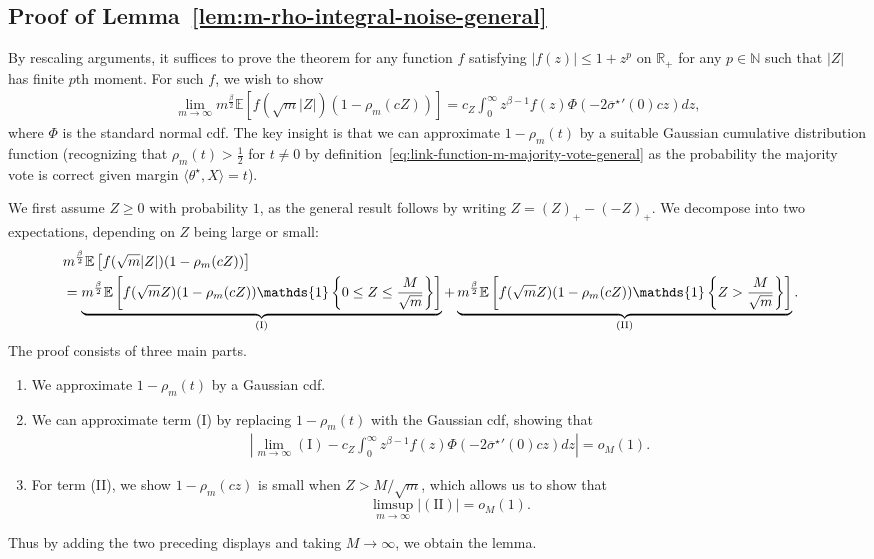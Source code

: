 \documentclass[11pt]{article}
\newcommand{\ind}{\mathds{1}}
\newcommand{\Ep}{\mathbb{E}}
\newcommand{\R}{\mathbb{R}} %
\newcommand{\N}{\mathbb{N}} %
\newcommand{\wb}[1]{\overline{#1}}
\newcommand{\<}{\langle} %
\renewcommand{\>}{\rangle}
\newcommand{\half}{\frac{1}{2}}
\newcommand{\opt}{^\star}
\begin{document}
\subsection{Proof of Lemma~\ref{lem:m-rho-integral-noise-general}} \label{proof:m-rho-integral-noise-general}
By rescaling arguments, it suffices to prove the theorem for any function
$f$ satisfying
$|f(z)| \leq 1 + z^p$ on $\R_+$ for any $p \in \N$ such that $|Z|$
has finite $p$th moment.  For such $f$, we wish to
show
\begin{align*}
  \lim_{m \to \infty} m^{\frac{\beta}{2}} \Ep \left[f(\sqrt{m}|Z|) (1 - \rho_m(c Z))\right] = c_Z \int_0^\infty z^{\beta-1} f(z) \Phi \left(-2 {\wb{\sigma}\opt}'(0) c z\right) dz,
\end{align*}
where $\Phi$ is the standard normal cdf. The key insight is that we can
approximate $1 - \rho_m(t)$ by a suitable Gaussian cumulative distribution
function (recognizing that $\rho_m(t) > \half$ for $t \neq 0$ by
definition~\eqref{eq:link-function-m-majority-vote-general} as the
probability the majority vote is correct given margin
$\<\theta\opt, X\> = t$).

We first assume $Z \geq 0$ with probability $1$, as the general result
follows by writing $Z = (Z)_+ - (-Z)_+$.  We decompose into two
expectations, depending on $Z$ being large or small:
\begin{align}
  \lefteqn{m^{\frac{\beta}{2}} \Ep \left[f(\sqrt m |Z|) (1 - \rho_m(cZ)) \right]}
  \nonumber \\
  & = \underbrace{m^{\frac{\beta}{2}} \Ep \left[f(\sqrt m Z) (1 - \rho_m(cZ)) \ind\left\{0 \leq Z \leq \frac{M}{\sqrt m}\right\} \right]}_{\mathrm{(I)}} + \underbrace{m^{\frac{\beta}{2}} \Ep \left[f(\sqrt m Z) (1 - \rho_m(cZ)) \ind\left\{Z > \frac{M}{\sqrt m}\right\} \right]}_{\mathrm{(II)}}   .  \label{eq:normal-mid-main}
\end{align}
The proof consists of three main parts. 
\begin{enumerate}[leftmargin=2em,label=\arabic*.]
\item We approximate $1-\rho_m(t)$ by a Gaussian cdf.
\item We can approximate term (I) by replacing $1-\rho_m(t)$ with
  the Gaussian cdf, showing that
  \begin{align}
    \left|\lim_{m \to \infty} \mathrm{(I)} - c_Z \int_0^\infty z^{\beta - 1} f(z) \Phi \left( - 2{\wb{\sigma}\opt}'(0) cz \right) dz \right| = o_M(1)   . \label{eq:normal-mid-3}
  \end{align} 
\item For term (II), we show $1- \rho_m(cz)$ is small when $Z > M/\sqrt{m}$, which allows us to show that
  \begin{equation*}
    \limsup_{m \to \infty}
    \left|\mathrm{(II)} \right| = o_M(1).
  \end{equation*}
\end{enumerate} 
Thus by adding the two preceding displays and taking $M \to \infty$, we
obtain the lemma.
\end{document}
